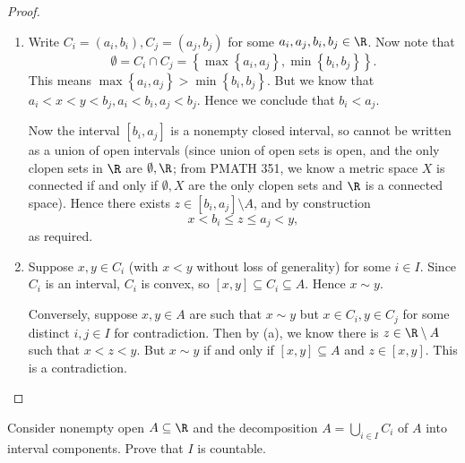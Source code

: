 \documentclass[pmath450]{subfiles}
\begin{document}
    \clearpage
    \begin{proof}
        \begin{enumerate}
            \item Write $C_i=\left( a_i,b_i \right), C_j=\left( a_j,b_j \right)$ for some $a_i,a_j,b_i,b_j\in\R$. Now note that
                \begin{equation*}
                    \emptyset = C_i\cap C_j = \left\lbrace \max\left\lbrace a_i,a_j \right\rbrace, \min\left\lbrace b_i,b_j \right\rbrace \right\rbrace.
                \end{equation*}
                This means $\max\left\lbrace a_i,a_j \right\rbrace>\min\left\lbrace b_i,b_j \right\rbrace$. But we know that $a_i<x<y<b_j, a_i<b_i, a_j<b_j$. Hence we conclude that $b_i<a_j$.

                Now the interval $\left[ b_i,a_j \right]$ is a nonempty closed interval, so cannot be written as a union of open intervals (since union of open sets is open, and the only clopen sets in $\R$ are $\emptyset,\R$; from PMATH 351, we know a metric space $X$ is connected if and only if $\emptyset, X$ are the only clopen sets and $\R$ is a connected space). Hence there exists $z\in \left[ b_i,a_j \right]\setminus A$, and by construction
                \begin{equation*}
                    x<b_i\leq z\leq a_j<y,
                \end{equation*}
                as required.

            \item Suppose $x,y\in C_i$ (with $x<y$ without loss of generality) for some $i\in I$. Since $C_i$ is an interval, $C_i$ is convex, so $\left[ x,y \right]\subseteq C_i\subseteq A$. Hence $x\sim y$.

                Conversely, suppose $x,y\in A$ are such that $x\sim y$ but $x\in C_i, y\in C_j$ for some distinct $i,j\in I$ for contradiction. Then by (a), we know there is $z\in\R\setminus A$ such that $x<z<y$. But $x\sim y$ if and only if $\left[ x,y \right]\subseteq A$ and $z\in \left[ x,y \right]$. This is a contradiction.
        \end{enumerate}
    \end{proof}

    \begin{exercise}{}
        Consider nonempty open $A\subseteq\R$ and the decomposition $A=\bigcup^{}_{i\in I}C_i$ of $A$ into interval components. Prove that $I$ is countable.
    \end{exercise}
\end{document}
